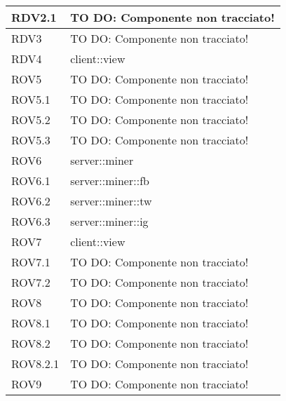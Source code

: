 \begin{center}
\begin{longtable}{| p{4cm} | p{8cm} |}
\hline
RDV2.1 & TO DO: Componente non tracciato! \\
\hline
RDV3 & TO DO: Componente non tracciato! \\
\hline
RDV4 & client::view \\
\hline
ROV5 & TO DO: Componente non tracciato! \\
\hline
ROV5.1 & TO DO: Componente non tracciato! \\
\hline
ROV5.2 & TO DO: Componente non tracciato! \\
\hline
ROV5.3 & TO DO: Componente non tracciato! \\
\hline
ROV6 & server::miner \\
\hline
ROV6.1 & server::miner::fb \\
\hline
ROV6.2 & server::miner::tw \\
\hline
ROV6.3 & server::miner::ig \\
\hline
ROV7 & client::view \\
\hline
ROV7.1 & TO DO: Componente non tracciato! \\
\hline
ROV7.2 & TO DO: Componente non tracciato! \\
\hline
ROV8 & TO DO: Componente non tracciato! \\
\hline
ROV8.1 & TO DO: Componente non tracciato! \\
\hline
ROV8.2 & TO DO: Componente non tracciato! \\
\hline
ROV8.2.1 & TO DO: Componente non tracciato! \\
\hline
ROV9 & TO DO: Componente non tracciato! \\
\hline
\end{longtable}
\egroup
\end{center}
